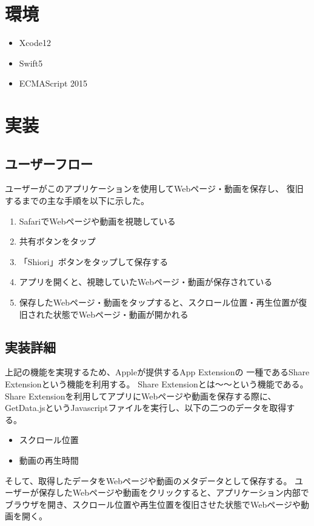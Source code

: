 \documentclass[a4j,10pt]{jsarticle}
\begin{document}
\section{環境}
\begin{itemize}
\item Xcode12
\item Swift5
\item ECMAScript 2015
\end{itemize}

\section{実装}
\subsection{ユーザーフロー}
ユーザーがこのアプリケーションを使用してWebページ・動画を保存し、
復旧するまでの主な手順を以下に示した。
\begin{enumerate}
\item SafariでWebページや動画を視聴している
\item 共有ボタンをタップ
\item 「Shiori」ボタンをタップして保存する
\item アプリを開くと、視聴していたWebページ・動画が保存されている
\item 保存したWebページ・動画をタップすると、スクロール位置・再生位置が復旧された状態でWebページ・動画が開かれる
\end{enumerate}

\subsection{実装詳細}
上記の機能を実現するため、Appleが提供するApp Extensionの
一種であるShare Extensionという機能を利用する。
Share Extensionとは〜〜という機能である。
Share Extensionを利用してアプリにWebページや動画を保存する際に、
GetData.jsというJavascriptファイルを実行し、以下の二つのデータを取得する。
\begin{itemize}
\item スクロール位置
\item 動画の再生時間
\end{itemize}

そして、取得したデータをWebページや動画のメタデータとして保存する。
ユーザーが保存したWebページや動画をクリックすると、アプリケーション内部で
ブラウザを開き、スクロール位置や再生位置を復旧させた状態でWebページや動画を開く。
\end{document}
